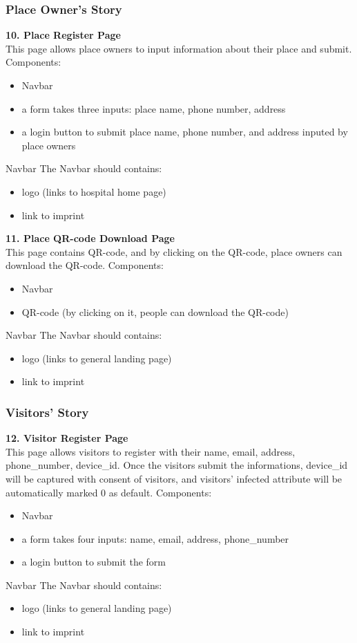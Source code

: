\documentclass{article}
\begin{document}
\subsubsection*{Place Owner's Story}
\textbf{10. Place Register Page}\\
This page allows place owners to input information about their place and submit.
Components:\\
\begin{itemize}
	\item Navbar
	\item a form takes three inputs: place name, phone number, address
	\item a login button to submit place name, phone number, and address inputed by place owners
\end{itemize}
Navbar
The Navbar should contains:
\begin{itemize}
	\item logo (links to hospital home page)
	\item link to imprint
\end{itemize}

\textbf{11. Place QR-code Download Page}\\
This page contains QR-code, and by clicking on the QR-code, place owners can download the QR-code.
Components:\\
\begin{itemize}
	\item Navbar
	\item QR-code (by clicking on it, people can download the QR-code)
\end{itemize}
Navbar
The Navbar should contains:
\begin{itemize}
	\item logo (links to general landing page)
	\item link to imprint
\end{itemize}

\subsubsection*{Visitors' Story}
\textbf{12. Visitor Register Page}\\
This page allows visitors to register with their name, email, address, phone\_number, device\_id.
Once the visitors submit the informations, device\_id will be captured with consent of visitors, and 
visitors' infected attribute will be automatically marked 0 as default.
Components:\\
\begin{itemize}
	\item Navbar
	\item a form takes four inputs: name, email, address, phone\_number
	\item a login button to submit the form
\end{itemize}
Navbar
The Navbar should contains:
\begin{itemize}
	\item logo (links to general landing page)
	\item link to imprint
\end{itemize}
\end{document}
